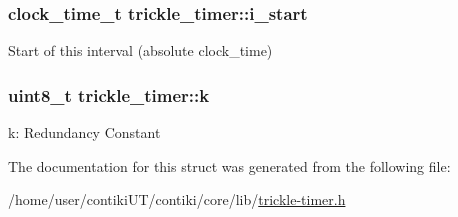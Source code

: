 \subsubsection[{i\+\_\+start}]{\setlength{\rightskip}{0pt plus 5cm}clock\+\_\+time\+\_\+t trickle\+\_\+timer\+::i\+\_\+start}\label{structtrickle__timer_aeabbbddcf3e3b015e9a8fd9f211bb21d}
Start of this interval (absolute clock\+\_\+time) \hypertarget{structtrickle__timer_a4d6ff0dd8bbb0c95250d78e452dabacf}{}
\subsubsection[{k}]{\setlength{\rightskip}{0pt plus 5cm}uint8\+\_\+t trickle\+\_\+timer\+::k}\label{structtrickle__timer_a4d6ff0dd8bbb0c95250d78e452dabacf}
k\+: Redundancy Constant 

The documentation for this struct was generated from the following file\+:\begin{DoxyCompactItemize}
\item 
/home/user/contiki\+U\+T/contiki/core/lib/\hyperlink{trickle-timer_8h}{trickle-\/timer.\+h}\end{DoxyCompactItemize}
